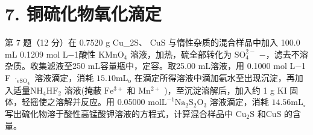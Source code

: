 \section*{7. 铜硫化物氧化滴定}
第 7 题（12 分）在 0.7520 g Cu_{2}S、 $\mathrm { C u S }$ 与惰性杂质的混合样品中加⼊ 100.0 mL 0.1209 mol L−1酸性 $\mathrm { K M n O _ { 4 } }$ 溶液，加热，硫全部转化为 $\mathrm { S O _ { 4 } ^ { 2 - } }$ −，滤去不溶杂质。收集滤液⾄250 mL容量瓶中，定容。取25.00 mL溶液，⽤ 0.1000 mol L−1 F $\mathrm { \cdot _ { e S O _ { 4 } } }$ 溶液滴定，消耗 $1 5 . 1 0 \mathrm { m L } _ { \mathrm { o } }$ 在滴定所得溶液中滴加氨⽔⾄出现沉淀，再加⼊适量$\mathrm { N H _ { 4 } H F _ { 2 } }$ 溶液(掩蔽 $\mathrm { F e ^ { 3 + } }$ 和 $\mathrm { M n ^ { 2 + } }$ )，⾄沉淀溶解后，加⼊约 1 g KI 固体，轻摇使之溶解并反应。⽤ 0.05000 mol$\mathrm { L ^ { - 1 } N a _ { 2 } S _ { 2 } O _ { 3 } }$ 溶液滴定，消耗 $1 4 . 5 6 \mathrm { m L } _ { \circ }$ 写出硫化物溶于酸性⾼锰酸钾溶液的⽅程式，计算混合样品中 $\mathrm { { C u _ { 2 } S } }$ 和$\mathrm { C u S }$ 的含量。
